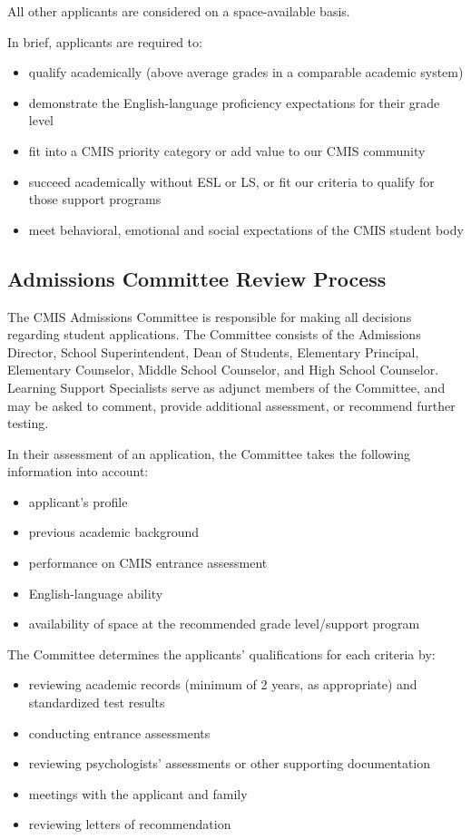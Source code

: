 All other applicants are considered on a space-available basis.

In brief, applicants are required to:

\begin{itemize}
\item qualify academically (above average grades in a comparable academic system)
\item demonstrate the English-language proficiency expectations for their grade level
\item fit into a CMIS priority category or add value to our CMIS community
\item succeed academically without ESL or LS, or fit our criteria to qualify for those support programs
\item meet behavioral, emotional and social expectations of the CMIS student body
\end{itemize}

\subsection{Admissions Committee Review Process}

The CMIS Admissions Committee is responsible for making all decisions regarding student applications. The Committee consists of the Admissions Director, School Superintendent, Dean of Students, Elementary Principal, Elementary Counselor, Middle School Counselor, and High School Counselor.    Learning Support Specialists serve as adjunct members of the Committee, and may be asked to comment, provide additional assessment, or recommend further testing.  

In their assessment of an application, the Committee takes the following information into account:

\begin{itemize}
\item applicant's profile
\item previous academic background
\item performance on CMIS entrance assessment
\item English-language ability
\item availability of space at the recommended grade level/support program
\end{itemize}

The Committee determines the applicants’ qualifications for each criteria by:

\begin{itemize}
\item reviewing academic records (minimum of 2 years, as appropriate) and standardized test results
\item conducting entrance assessments
\item reviewing psychologists' assessments or other supporting documentation
\item meetings with the applicant and family
\item reviewing letters of recommendation
\end{itemize}

